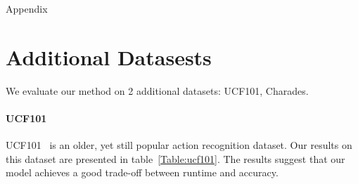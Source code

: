 \documentclass[10pt,twocolumn,letterpaper]{article}
\begin{document}
{\small


}



\clearpage
\appendix
\newpage


\begin{center} \begin{huge}{Appendix} \end{huge} \end{center}
\label{appendix}

\section{Additional Datasests}

We evaluate our method on 2 additional datasets: UCF101, Charades. 








\paragraph{UCF101}

UCF101~\cite{soomro2012ucf101} is an older, yet still popular action recognition dataset.  Our results on this dataset are presented in table~\ref{Table:ucf101}. The results suggest that our model achieves a good trade-off between runtime and accuracy. 
\end{document}
